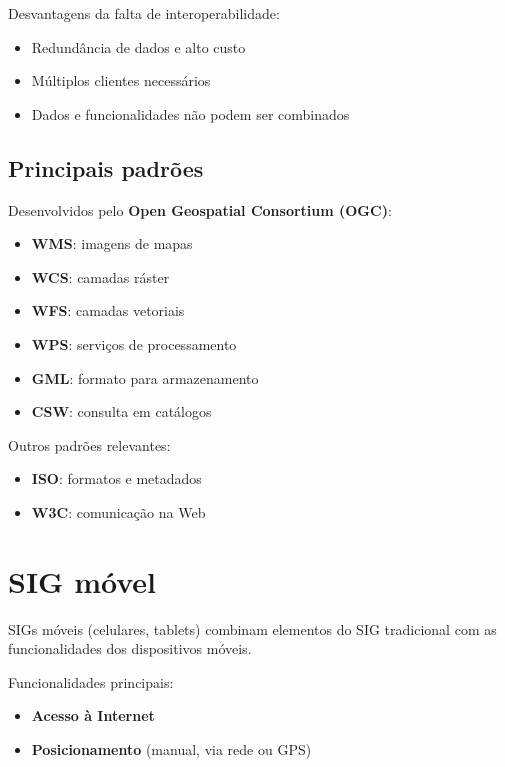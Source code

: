 Desvantagens da falta de interoperabilidade:

\begin{itemize}
 \item Redundância de dados e alto custo
 \item Múltiplos clientes necessários
 \item Dados e funcionalidades não podem ser combinados
\end{itemize}

\subsection{Principais padrões}

Desenvolvidos pelo \textbf{Open Geospatial Consortium (OGC)}:

\begin{itemize}
 \item \textbf{WMS}: imagens de mapas
 \item \textbf{WCS}: camadas ráster
 \item \textbf{WFS}: camadas vetoriais
 \item \textbf{WPS}: serviços de processamento
 \item \textbf{GML}: formato para armazenamento
 \item \textbf{CSW}: consulta em catálogos
\end{itemize}

Outros padrões relevantes:

\begin{itemize}
 \item \textbf{ISO}: formatos e metadados
 \item \textbf{W3C}: comunicação na Web
\end{itemize}

\section{SIG móvel}

SIGs móveis (celulares, tablets) combinam elementos do SIG tradicional com as funcionalidades dos dispositivos móveis.

Funcionalidades principais:

\begin{itemize}
 \item \textbf{Acesso à Internet}
 \item \textbf{Posicionamento} (manual, via rede ou GPS)
\end{itemize}

